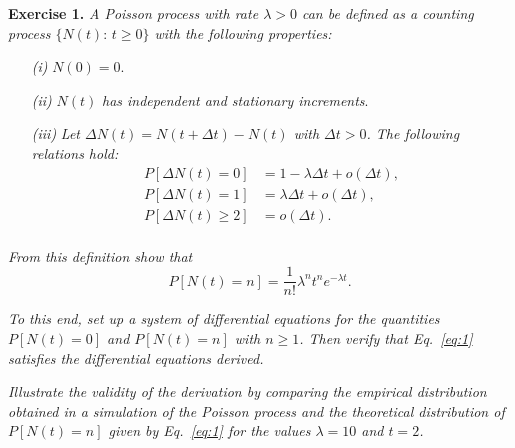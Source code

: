 
\textbf{Exercise 1.} \emph{A Poisson process with rate \( \lambda > 0 \) can be defined as a counting process \( \{N(t):\, t \geq 0\} \) with the following properties:}
\begin{enumerate}
  \item[\textit{(i)}] \emph{\( N(0) = 0 \)}.
  \item[\textit{(ii)}] \( N(t) \) \emph{has independent and stationary increments}.
  \item[\textit{(iii)}] \emph{Let \( \Delta N(t)  = N(t + \Delta t) - N(t)\) with $\Delta t > 0$. The following relations hold: }
        \[
        \begin{aligned}
          P[\Delta N(t) = 0] &= 1 - \lambda \Delta t + o(\Delta t),\\
          P[\Delta N(t) = 1] &= \lambda \Delta t + o(\Delta t),\\
          P[\Delta N(t) \geq 2] &= o(\Delta t).\\
        \end{aligned}
        \]
\end{enumerate}
\emph{From this definition show that}
\begin{equation}\label{eq:1}
  P[N(t) = n] = \frac{1}{n!}\lambda^{n}t^{n} e^{-\lambda t}.
\end{equation}

\emph{To this end, set up a system of differential equations for the quantities \( P[N(t) = 0] \) and \( P[N(t) = n] \) with \( n \geq 1 \). Then verify that Eq.~\eqref{eq:1} satisfies the differential equations derived.}

\emph{Illustrate the validity of the derivation by comparing the empirical distribution obtained in a simulation of the Poisson process and the theoretical distribution of \( P[N(t) = n ]\) given by Eq.~\eqref{eq:1} for the values \( \lambda = 10 \) and \( t = 2 \).}


